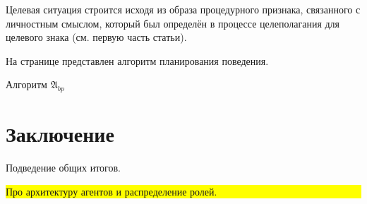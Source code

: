 \documentclass[a4paper, 12pt]{article}
\theoremstyle{plain}
\begin{document}
	Целевая ситуация строится исходя из образа процедурного признака, связанного с личностным смыслом, который был определён в процессе целеполагания для целевого знака (см. первую часть статьи).
	
	На странице \pageref{alg:beh_plan} представлен алгоритм планирования поведения.
	\begin{algorithm}
		\caption{Алгоритм $\mathfrak{A}_{bp}$}\label{alg:beh_plan}
		\begin{algorithmic}[1]
			
		\end{algorithmic}
	\end{algorithm}
	
	\section*{Заключение} Подведение общих итогов.
	
	\noindent\colorbox{yellow}{
		\parbox{\dimexpr\linewidth-2\fboxsep}{Про архитектуру агентов и распределение ролей.}
	}
	
	
	
\end{document}
